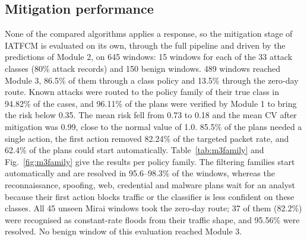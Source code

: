 \documentclass[]{interact}
\theoremstyle{plain}
\theoremstyle{definition}
\begin{document}
\subsection{Mitigation performance}
None of the compared algorithms applies a response, so the mitigation stage of IATFCM is evaluated on its own, through the full pipeline and driven by the predictions of Module 2, on 645 windows: 15 windows for each of the 33 attack classes (80\% attack records) and 150 benign windows. 489 windows reached Module 3, 86.5\% of them through a class policy and 13.5\% through the zero-day route. Known attacks were routed to the policy family of their true class in 94.82\% of the cases, and 96.11\% of the plans were verified by Module 1 to bring the risk below 0.35. The mean risk fell from 0.73 to 0.18 and the mean CV after mitigation was 0.99, close to the normal value of 1.0. 85.5\% of the plans needed a single action, the first action removed 82.24\% of the targeted packet rate, and 62.4\% of the plans could start automatically. Table~\ref{tab:m3family} and Fig.~\ref{fig:m3family} give the results per policy family. The filtering families start automatically and are resolved in 95.6--98.3\% of the windows, whereas the reconnaissance, spoofing, web, credential and malware plans wait for an analyst because their first action blocks traffic or the classifier is less confident on these classes. All 45 unseen Mirai windows took the zero-day route; 37 of them (82.2\%) were recognised as constant-rate floods from their traffic shape, and 95.56\% were resolved. No benign window of this evaluation reached Module 3.
\end{document}
